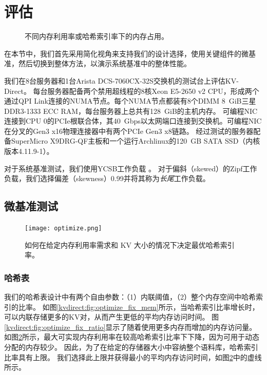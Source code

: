 \section{评估}
\label{kvdirect:sec:eval}

\begin{figure}[t]
\caption{不同内存利用率或哈希索引率下的内存占用。}
\label{kvdirect:fig:memory-access-count}
\end{figure}

\label{kvdirect:sec:evaluation}
在本节中，我们首先采用简化视角来支持我们的设计选择，使用关键组件的微基准，然后切换到整体方法，以演示系统基准中\oursys {}的整体性能。


我们在8台服务器和1台Arista DCS-7060CX-32S交换机的测试台上评估KV-Direct。
每台服务器配备两个禁用超线程的8核Xeon E5-2650 v2 CPU，形成两个通过QPI Link连接的NUMA节点。每个NUMA节点都装有8个DIMM 8~GiB三星DDR3-1333 ECC RAM，每台服务器上总共有128~GiB的主机内存。
可编程NIC~ \cite {caulfield2016cloud}连接到CPU 0的PCIe根联合体，其40~Gbps以太网端口连接到交换机。可编程NIC在分叉的Gen3 x16物理连接器中有两个PCIe Gen3 x8链路。
经过测试的服务器配备SuperMicro X9DRG-QF主板和一个运行Archlinux的120~GB SATA SSD（内核版本4.11.9-1）。

对于系统基准测试，我们使用YCSB工作负载 \cite {cooper2010benchmarking}。
对于偏斜（skewed）的Zipf工作负载，我们选择偏差（skewness）0.99并将其称为\textit {长尾}工作负载。

\subsection{微基准测试}
\label{kvdirect:sec:microbenchmarks}


\begin{figure}[t]
\centering
\texttt{[image: optimize.png]}
\caption{如何在给定内存利用率需求和 KV 大小的情况下决定最优哈希索引率。}
\label{kvdirect:fig:hashline-ratio}

\end{figure}

\subsubsection{哈希表}
\label{kvdirect:sec:hashtable-eval}

我们的哈希表设计中有两个自由参数：（1）内联阈值，（2）整个内存空间中哈希索引的比率。
如图\ref {kvdirect:fig:optimize_fix_mem}所示，当哈希索引比率增长时，可以内联存储更多的KV对，从而产生更低的平均内存访问时间。
图\ref {kvdirect:fig:optimize_fix_ratio}显示了随着使用更多内存而增加的内存访问量。
如图\ref {kvdirect:fig:hashline-ratio}所示，最大可实现内存利用率在较高哈希索引比率下下降，因为可用于动态分配的内存较少。
因此，为了在给定的存储器大小中容纳整个语料库，哈希索引比率具有上限。
我们选择此上限并获得最小的平均内存访问时间，如图\ref {kvdirect:fig:hashline-ratio}中的虚线所示。

